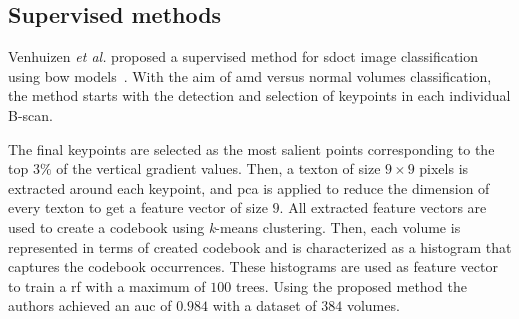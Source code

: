 \subsection{Supervised methods}

Venhuizen \textit{et al.} proposed a supervised method for \gls{sdoct} image classification using \gls{bow} models~\cite{Venhuizen2015}.
With the aim of \gls{amd} versus normal volumes classification, the method starts with the detection and selection of keypoints in each individual B-scan. %

The final keypoints are selected as the most salient points corresponding to the top $3 \%$ of the vertical gradient values.
Then, a texton of size $9 \times 9$ pixels is extracted around each keypoint, and \gls{pca} is applied to reduce the dimension of every texton to get a feature vector of size $9$.
All extracted feature vectors are used to create a codebook using \textit{k}-means clustering.
Then, each volume is represented in terms of created codebook and is characterized as a histogram that captures the codebook occurrences.
These histograms are used as feature vector to train a \gls{rf} with a maximum of $100$ trees.
Using the proposed method the authors achieved an \gls{auc} of $0.984$ with a dataset of $384$ volumes.


